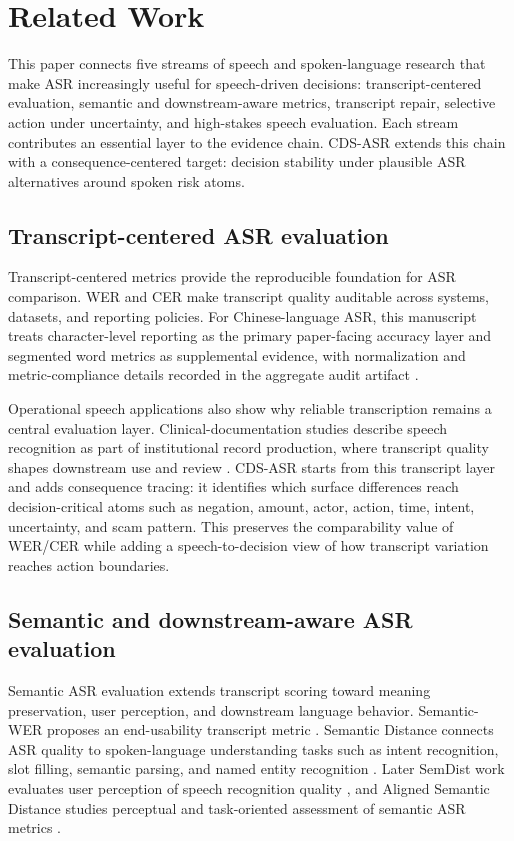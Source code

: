 \section{Related Work}

This paper connects five streams of speech and spoken-language research that make ASR increasingly useful for speech-driven decisions: transcript-centered evaluation, semantic and downstream-aware metrics, transcript repair, selective action under uncertainty, and high-stakes speech evaluation. Each stream contributes an essential layer to the evidence chain. CDS-ASR extends this chain with a consequence-centered target: decision stability under plausible ASR alternatives around spoken risk atoms.

\subsection{Transcript-centered ASR evaluation}

Transcript-centered metrics provide the reproducible foundation for ASR comparison. WER and CER make transcript quality auditable across systems, datasets, and reporting policies. For Chinese-language ASR, this manuscript treats character-level reporting as the primary paper-facing accuracy layer and segmented word metrics as supplemental evidence, with normalization and metric-compliance details recorded in the aggregate audit artifact .

Operational speech applications also show why reliable transcription remains a central evaluation layer. Clinical-documentation studies describe speech recognition as part of institutional record production, where transcript quality shapes downstream use and review \citep{hodgson2016risks,blackley2019speech}. CDS-ASR starts from this transcript layer and adds consequence tracing: it identifies which surface differences reach decision-critical atoms such as negation, amount, actor, action, time, intent, uncertainty, and scam pattern. This preserves the comparability value of WER/CER while adding a speech-to-decision view of how transcript variation reaches action boundaries.

\subsection{Semantic and downstream-aware ASR evaluation}

Semantic ASR evaluation extends transcript scoring toward meaning preservation, user perception, and downstream language behavior. Semantic-WER proposes an end-usability transcript metric \citep{roy2021semantic}. Semantic Distance connects ASR quality to spoken-language understanding tasks such as intent recognition, slot filling, semantic parsing, and named entity recognition \citep{kim2021semanticdistance}. Later SemDist work evaluates user perception of speech recognition quality \citep{kim2022semdist}, and Aligned Semantic Distance studies perceptual and task-oriented assessment of semantic ASR metrics \citep{rugayan2023asd}.

